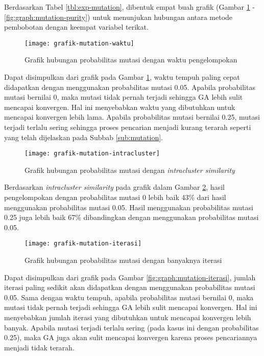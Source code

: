 \begin{enumerate}
		Berdasarkan Tabel \ref{tbl:exp-mutation}, dibentuk empat buah grafik (Gambar \ref{fig:graph:mutation-time} - \ref{fig:graph:mutation-purity}) untuk menunjukan hubungan antara metode pembobotan dengan keempat variabel terikat.
		
		\begin{figure}[H]
			\centering
			\texttt{[image: grafik-mutation-waktu]}
			\caption{Grafik hubungan probabilitas mutasi dengan waktu pengelompokan}
			\label{fig:graph:mutation-time}
		\end{figure}
		
		Dapat disimpulkan dari grafik pada Gambar \ref{fig:graph:mutation-time}, waktu tempuh paling cepat didapatkan dengan menggunakan probabilitas mutasi 0.05. Apabila probabilitas mutasi bernilai 0, maka mutasi tidak pernah terjadi sehingga GA lebih sulit mencapai konvergen. Hal ini menyebabkan waktu yang dibutuhkan untuk mencapai konvergen lebih lama. Apabila probabilitas mutasi bernilai 0.25, mutasi terjadi terlalu sering sehingga proses pencarian menjadi kurang terarah seperti yang telah dijelaskan pada Subbab \ref{sub:mutation}.
		
		\begin{figure}[H]
			\centering
			\texttt{[image: grafik-mutation-intracluster]}
			\caption{Grafik hubungan probabilitas mutasi dengan \textit{intracluster similarity}}
			\label{fig:graph:mutation-intra}
		\end{figure}
		
		Berdasarkan \textit{intracluster similarity} pada grafik dalam Gambar  \ref{fig:graph:mutation-intra}, hasil pengelompokan dengan probabilitas mutasi 0 lebih baik 43\% dari hasil menggunakan probabilitas mutasi 0.05. Hasil menggunakan probabilitas mutasi 0.25 juga lebih baik 67\% dibandingkan dengan menggunakan probabilitas mutasi 0.05.
		
		\begin{figure}[H]
			\centering
			\texttt{[image: grafik-mutation-iterasi]}
			\caption{Grafik hubungan probabilitas mutasi dengan banyaknya iterasi}
			\label{fig:graph:mutation-iteration}
		\end{figure}
		
		Dapat disimpulkan dari grafik pada Gambar \ref{fig:graph:mutation-iterasi}, jumlah iterasi paling sedikit akan didapatkan dengan menggunakan probabilitas mutasi 0.05. Sama dengan waktu tempuh, apabila probabilitas mutasi bernilai 0, maka mutasi tidak pernah terjadi sehingga GA lebih sulit mencapai konvergen. Hal ini menyebabkan jumlah iterasi yang dibutuhkan untuk mencapai konvergen lebih banyak. Apabila mutasi terjadi terlalu sering (pada kasus ini dengan probabilitas 0.25), maka GA juga akan sulit mencapai konvergen karena proses pencariannya menjadi tidak terarah.
		

\end{enumerate}
